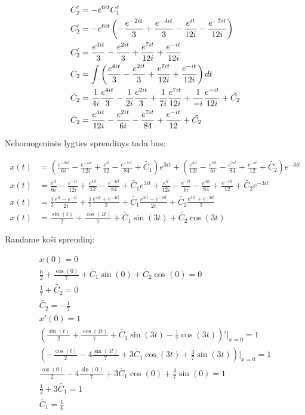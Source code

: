 \documentclass[11pt]{article}
\begin{document}
\begin{align}
C_2'&=-e^{6it}C_1'\notag\\
C_2'&=-e^{6it}\left(-\frac{e^{-2it}}{3}+\frac{e^{-4it}}{3}-\frac{e^{it}}{12i}-\frac{e^{-7it}}{12i}\right)\notag\\
C_2'&=\frac{e^{4it}}{3}-\frac{e^{2it}}{3}+\frac{e^{7it}}{12i}+\frac{e^{-it}}{12i}\\
C_2&=\int\left(\frac{e^{4it}}{3}-\frac{e^{2it}}{3}+\frac{e^{7it}}{12i}+\frac{e^{-it}}{12i}\right)dt\notag\\
C_2&=\frac{1}{4i}\frac{e^{4it}}{3}-\frac{1}{2i}\frac{e^{2it}}{3}+\frac{1}{7i}\frac{e^{7it}}{12i}+\frac{1}{-i}\frac{e^{-it}}{12i}+\tilde{C_2}\notag\\
C_2&=\frac{e^{4it}}{12i}-\frac{e^{2it}}{6i}-\frac{e^{7it}}{84}+\frac{e^{-it}}{12}+\tilde{C_2}
\end{align}

Nehomogeninės lygties sprendinys tada bus:

\begin{align*}
x(t)&=\left(\frac{e^{-2it}}{6i}-\frac{e^{-4it}}{12i}+\frac{e^{it}}{12}-\frac{e^{-7it}}{84}+\tilde{C_1}\right)e^{3it}
+\left(\frac{e^{4it}}{12i}-\frac{e^{2it}}{6i}-\frac{e^{7it}}{84}+\frac{e^{-it}}{12}+\tilde{C_2}\right)e^{-3it}\\
x(t)&=\frac{e^{it}}{6i}-\frac{e^{-it}}{12i}+\frac{e^{4it}}{12}-\frac{e^{-4it}}{84}+\tilde{C_1}e^{3it}
+\frac{e^{it}}{12i}-\frac{e^{-it}}{6i}-\frac{e^{4it}}{84}+\frac{e^{-4it}}{12}+\tilde{C_2}e^{-3it}\\
x(t)&=\frac{1}{2}\frac{e^{it}-e^{-it}}{2i}+\frac{1}{7}\frac{e^{4it}+e^{-4it}}{2}+\tilde{C_1}\frac{e^{3it}-e^{-3it}}{2i}+\tilde{C_2}\frac{e^{3it}+e^{-3it}}{2}\\
x(t)&=\frac{\sin(t)}{2}+\frac{\cos(4t)}{7}+\tilde{C_1}\sin(3t)+\tilde{C_2}\cos(3t)
\end{align*}

Randame koši sprendinį:

\begin{align*}
x(0)=0\\
\frac{0}{2}+\frac{\cos(0)}{7}+\tilde{C_1}\sin(0)+\tilde{C_2}\cos(0)=0\\
\frac{1}{7}+\tilde{C_2}=0\\
\tilde{C_2}=-\frac{1}{7}\\
x'(0)=1\\
\left(\frac{\sin(t)}{2}+\frac{\cos(4t)}{7}+\tilde{C_1}\sin(3t)-\frac{1}{7}\cos(3t)\right)'\Big\vert_{x=0}=1\\
\left(-\frac{\cos(t)}{2}-4\frac{\sin(4t)}{7}+3\tilde{C_1}\cos(3t)+\frac{3}{7}\sin(3t)\right)\Big\vert_{x=0}=1\\
\frac{\cos(0)}{2}-4\frac{\sin(0)}{7}+3\tilde{C_1}\cos(0)+\frac{3}{7}\sin(0)=1\\
\frac{1}{2}+3\tilde{C_1}=1\\
\tilde{C_1}=\frac{1}{6}\\
\end{align*}
\end{document}
